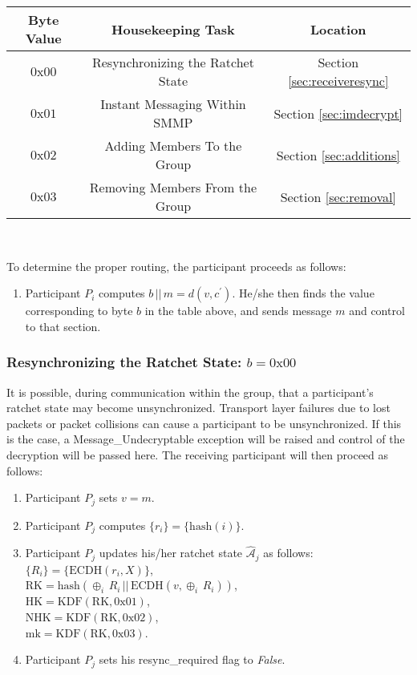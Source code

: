 \documentclass[%
preprint,
amsmath,amssymb,
aps,
prb,
floatfix,
]{revtex4-1}
\begin{document}
\begin{centering}
\begin{tabular}{|c|c|c|}
\hline
Byte Value & Housekeeping Task & Location \\
\hline
$0\mathrm{x}00$ & Resynchronizing the Ratchet State  & Section \ref{sec:receiveresync}\\
$0\mathrm{x}01$ & Instant Messaging Within SMMP & Section \ref{sec:imdecrypt}\\
$0\mathrm{x}02$ & Adding Members To the Group & Section \ref{sec:additions}\\
$0\mathrm{x}03$ & Removing Members From the Group & Section \ref{sec:removal}\\
\hline
\end{tabular} \\
\end{centering}
\bigskip
To determine the proper routing, the
participant proceeds as follows:
\begin{enumerate}
\item Participant $P_i$ computes $b \, || \, m = d(v, c^\prime)$. He/she then
finds the value corresponding to byte $b$ in the table above, and sends message
$m$ and control to that section.
\end{enumerate}
\subsubsection{\label{sec:receiveresync}Resynchronizing the Ratchet State: $b =
0\mathrm{x}00$}
It is possible, during communication within the group, that a participant's
ratchet state may become unsynchronized. Transport layer failures due to lost
packets or packet collisions can cause a participant to be unsynchronized. If
this is the case, a Message\_Undecryptable exception will be raised
and control of the decryption will be passed here. The receiving participant
will then proceed as follows:
\begin{enumerate}
\item Participant $P_j$ sets $v = m$.
\item Participant $P_j$ computes $\{r_i\} = \{\mathrm{hash}(i)\}$.
\item Participant $P_j$ updates his/her ratchet state
$\mathcal{\hat{A}}_j$ as follows:\\
$\{R_i\} = \{\mathrm{ECDH}(r_i, X)\}$, \\
$\mathrm{RK} = \mathrm{hash}(\oplus_i \, R_i \, || \, \mathrm{ECDH}(v, \oplus_i
\, R_i))$, \\
$\mathrm{HK} = \mathrm{KDF}(\mathrm{RK}, 0\mathrm{x}01)$, \\
$\mathrm{NHK} = \mathrm{KDF}(\mathrm{RK}, 0\mathrm{x}02)$, \\
$\mathrm{mk} = \mathrm{KDF}(\mathrm{RK}, 0\mathrm{x}03)$.
\item Participant $P_j$ sets his resync\_required flag to \textit{False}.
\end{enumerate}
\end{document}
